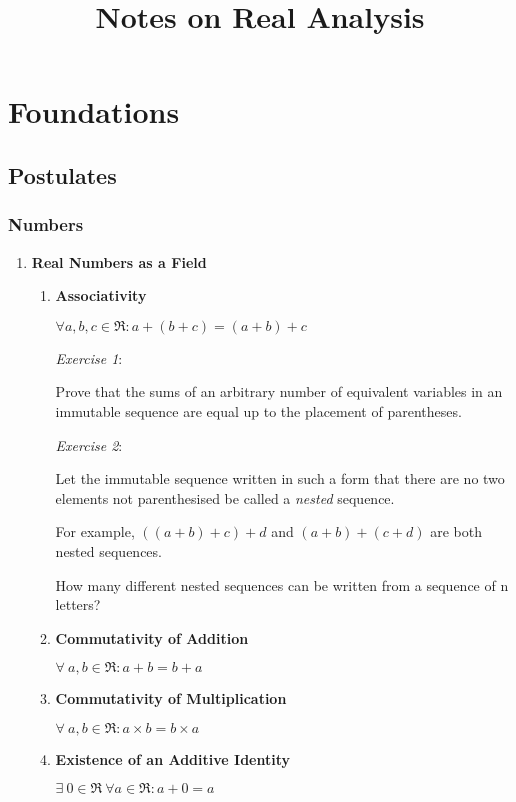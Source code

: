 \documentclass{article}
\date{}
\title{Notes on Real Analysis}
\begin{document}
\maketitle

\section{Foundations}
\label{sec-1}
\subsection{Postulates}
\label{sec-1-1}
\subsubsection{Numbers}
\label{sec-1-1-1}
\begin{enumerate}
\item \textbf{Real Numbers as a Field}
\label{sec-1-1-1-1}

\begin{enumerate}
\item \textbf{Associativity}

$\forall a,b,c \in \Re: a+(b+c)=(a+b)+c$

\emph{Exercise 1}:

Prove that the sums of an arbitrary number of equivalent variables in an immutable sequence are equal up to the placement of parentheses.

\emph{Exercise 2}:

Let the immutable sequence written in such a form that there are no two elements not parenthesised be called a \emph{nested} sequence.

For example, $((a+b)+c)+d$ and $(a+b)+(c+d)$ are both nested sequences.

How many different nested sequences can be written from a sequence of n letters?

\item \textbf{Commutativity of Addition}

$\forall \ a, b \in \Re: a+b=b+a$

\item \textbf{Commutativity of Multiplication}

$\forall \ a, b \in \Re: a \times b=b \times a$

\item \textbf{Existence of an Additive Identity}

$\exists \ 0\in \Re\ \forall a \in \Re: a+0=a$


\end{enumerate}
\end{enumerate}
\end{document}
